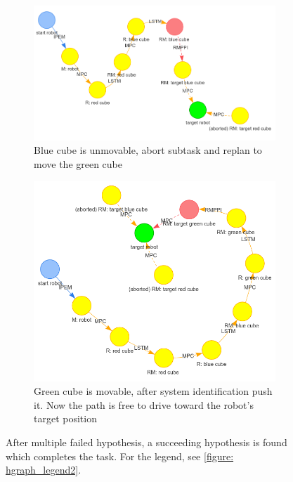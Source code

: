 \begin{figure}[H]
    \ContinuedFloat
     \begin{subfigure}[b]{0.49\textwidth}
         \centering
         \includegraphics[width=\textwidth]{figures/surrounded/7.png}
         \caption{Blue cube is unmovable, abort subtask and replan to move the green cube}
     \end{subfigure}
     \hfill
     \begin{subfigure}[b]{0.49\textwidth}
         \centering
         \includegraphics[width=\textwidth]{figures/surrounded/8.png}
         \caption{Green cube is movable, after system identification push it. Now the path is free to drive toward the robot's target position}
     \end{subfigure}
     \caption{After multiple failed hypothesis, a succeeding hypothesis is found which completes the task. For the legend, see \cref{figure: hgraph_legend2}.}
     \label{figure: surrounded_hgraph_second}
\end{figure}

